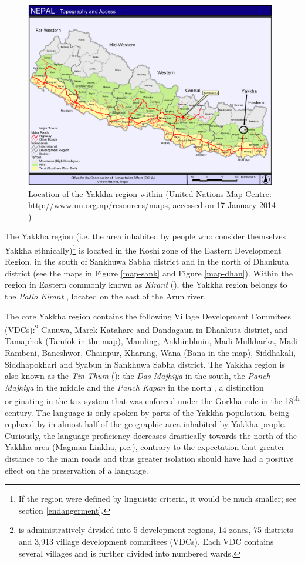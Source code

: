 \begin{figure}
\centering
\includegraphics[width=11cm]{figures/Nepalkarte.pdf}
\caption{Location of the Yakkha region within  (United Nations Map Centre: http://www.un.org.np/resources/maps, accessed on 17 January 2014 )}\label{nepalmap}
\end{figure}

The Yakkha region (i.e. the area inhabited by people who consider themselves Yakkha ethnically)\footnote{If the region were defined by linguistic criteria, it would be much smaller; see section \ref{endangerment}.} is located in the Koshi zone of the Eastern Development Region, in the south of Sankhuwa Sabha district and in the north of Dhankuta  district  (see the maps in Figure \ref{map-sank} and Figure \ref{map-dhan}). Within the region in  Eastern  commonly known as \emph{Kirant} (), the Yakkha region belongs to the \emph{Pallo Kirant} , located on the east of the Arun river. 

The core Yakkha region contains the following Village Development Commitees (VDCs):\footnote{ is administratively divided into 5 development regions, 14 zones, 75 districts and  3,913 village development commitees (VDCs). Each VDC  contains several villages and is further divided into numbered wards.} Canuwa, Marek Katahare and Dandagaun in Dhankuta district, and Tamaphok (Tamfok in the map), Mamling, Ankhinbhuin, Madi Mulkharka, Madi Rambeni, Baneshwor, Chainpur, Kharang, Wana (Bana in the map), Siddhakali, Siddhapokhari and Syabun in Sankhuwa Sabha district. The Yakkha region is also known as the \emph{Tin Thum} (): the \emph{Das Majhiya} in the south, the \emph{Panch Majhiya} in the middle and the \emph{Panch Kapan} in the north  \citep[86]{Kongren2007Indigenous}, a distinction originating in the tax system that was enforced under the Gorkha rule in the 18\textsuperscript{th} century. The language is  only spoken by parts of the Yakkha population, being replaced by  in almost half of the geographic area inhabited by Yakkha people. Curiously, the language proficiency decreases drastically towards the north of the Yakkha area (Magman Linkha, p.c.), contrary to the expectation that greater distance to the main roads and thus greater isolation should have had a positive effect on the preservation of a language. 



